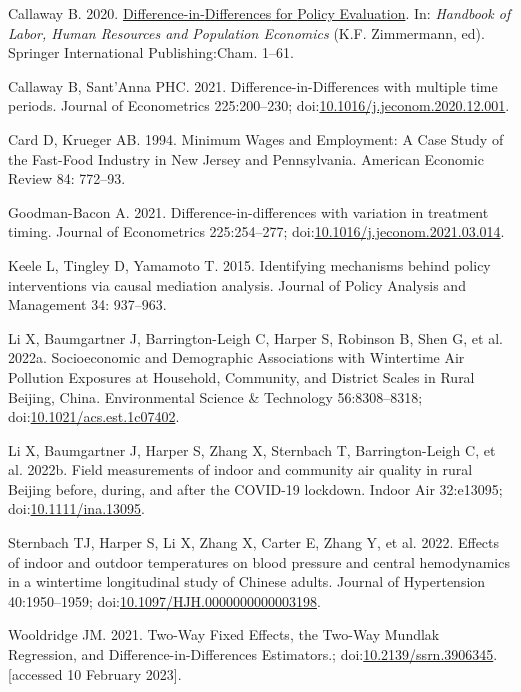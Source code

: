 \documentclass[
  letterpaper,
  DIV=11,
  numbers=noendperiod]{scrartcl}
\newlength{\cslhangindent}
\newlength{\cslentryspacingunit} %
\newenvironment{CSLReferences}[2] %
 {%
  \setlength{\parindent}{0pt}
  \ifodd #1
  \let\oldpar\par
  \def\par{\hangindent=\cslhangindent\oldpar}
  \fi
  \setlength{\parskip}{#2\cslentryspacingunit}
 }%
 {}
\begin{document}
\hypertarget{refs}{}
\begin{CSLReferences}{1}{0}
\leavevmode{}%
Callaway B. 2020.
\href{https://doi.org/10.1007/978-3-319-57365-6_352-1}{Difference-in-{Differences}
for {Policy Evaluation}}. In: \emph{Handbook of {Labor}, {Human
Resources} and {Population Economics}} (K.F. Zimmermann, ed). {Springer
International Publishing}:{Cham}. 1--61.

\leavevmode{}%
Callaway B, Sant'Anna PHC. 2021. Difference-in-{Differences} with
multiple time periods. Journal of Econometrics 225:200--230;
doi:\href{https://doi.org/10.1016/j.jeconom.2020.12.001}{10.1016/j.jeconom.2020.12.001}.

\leavevmode{}%
Card D, Krueger AB. 1994. Minimum {Wages} and {Employment}: {A Case
Study} of the {Fast-Food Industry} in {New Jersey} and {Pennsylvania}.
American Economic Review 84: 772--93.

\leavevmode{}%
Goodman-Bacon A. 2021. Difference-in-differences with variation in
treatment timing. Journal of Econometrics 225:254--277;
doi:\href{https://doi.org/10.1016/j.jeconom.2021.03.014}{10.1016/j.jeconom.2021.03.014}.

\leavevmode{}%
Keele L, Tingley D, Yamamoto T. 2015. Identifying mechanisms behind
policy interventions via causal mediation analysis. Journal of Policy
Analysis and Management 34: 937--963.

\leavevmode{}%
Li X, Baumgartner J, Barrington-Leigh C, Harper S, Robinson B, Shen G,
et al. 2022a. Socioeconomic and {Demographic Associations} with
{Wintertime Air Pollution Exposures} at {Household}, {Community}, and
{District Scales} in {Rural Beijing}, {China}. Environmental Science \&
Technology 56:8308--8318;
doi:\href{https://doi.org/10.1021/acs.est.1c07402}{10.1021/acs.est.1c07402}.

\leavevmode{}%
Li X, Baumgartner J, Harper S, Zhang X, Sternbach T, Barrington-Leigh C,
et al. 2022b. Field measurements of indoor and community air quality in
rural {Beijing} before, during, and after the {COVID-19} lockdown.
Indoor Air 32:e13095;
doi:\href{https://doi.org/10.1111/ina.13095}{10.1111/ina.13095}.

\leavevmode{}%
Sternbach TJ, Harper S, Li X, Zhang X, Carter E, Zhang Y, et al. 2022.
Effects of indoor and outdoor temperatures on blood pressure and central
hemodynamics in a wintertime longitudinal study of {Chinese} adults.
Journal of Hypertension 40:1950--1959;
doi:\href{https://doi.org/10.1097/HJH.0000000000003198}{10.1097/HJH.0000000000003198}.

\leavevmode{}%
Wooldridge JM. 2021. Two-{Way Fixed Effects}, the {Two-Way Mundlak
Regression}, and {Difference-in-Differences Estimators}.;
doi:\href{https://doi.org/10.2139/ssrn.3906345}{10.2139/ssrn.3906345}.
{[}accessed 10 February 2023{]}.

\end{CSLReferences}
\end{document}
